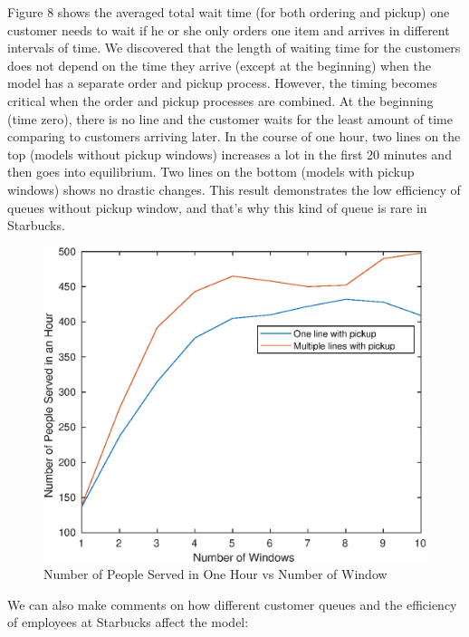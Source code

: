 \documentclass[a4paper]{article}
\begin{document}
Figure 8 shows the averaged total wait time (for both ordering and pickup) one customer needs to wait if he or she only orders one item and arrives in different intervals of time. We discovered that the length of waiting time for the customers does not depend on the time they arrive (except at the beginning) when the model has a separate order and pickup process. However, the timing becomes critical when the order and pickup processes are combined.
At the beginning (time zero), there is no line and the customer waits for the least amount of time comparing to customers arriving later. In the course of one hour, two lines on the top (models without pickup windows) increases a lot in the first 20 minutes and then goes into equilibrium. Two lines on the bottom (models with pickup windows) shows no drastic changes. This result demonstrates the low efficiency of queues without pickup window, and that's why this kind of queue is rare in Starbucks.

\begin{figure}[H]
	\centering
	\includegraphics[width=0.35\textheight]{people_vs_window}
	\caption{Number of People Served in One Hour vs Number of Window}
\end{figure}

We can also make comments on how different customer queues and the efficiency of employees at Starbucks affect the model:
\end{document}
